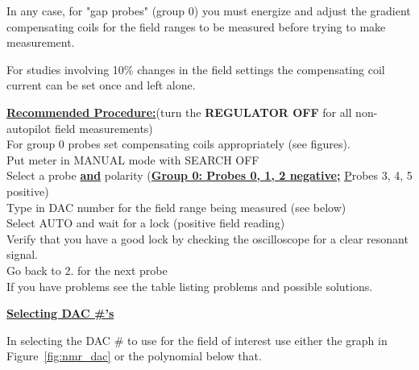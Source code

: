 {In any case, for "gap probes" (group 0) you must energize and adjust 
the gradient compensating coils for the field ranges to be measured before 
trying to make measurement.

For studies involving 
10\% changes in the field settings the compensating coil current can be 
set once and left alone.


\noindent\underline{\bf Recommended Procedure:}(turn the {\bf REGULATOR OFF} for all 
non-autopilot field measurements)\\
For group 0 probes set compensating coils appropriately (see figures).\\
Put meter in MANUAL mode with SEARCH OFF \\
Select a probe \underline{\bf and} polarity (\underline{\bf Group 0:  
Probes 0, 1, 2 negative;} {\underline Probes 3, 4, 5 positive}) \\
Type in DAC number for the field range being measured (see below) \\
Select AUTO and wait for a lock (positive field reading) \\
Verify that you have a good lock by checking the oscilloscope for a 
clear resonant signal. \\
Go back to 2. for the next probe \\
If you have problems see the table listing problems and possible 
solutions.

\noindent\underline{\bf Selecting DAC \#'s}

In selecting the DAC \# to use for the field of interest use 
either the graph in Figure~\ref{fig:nmr_dac} or the polynomial below that.

\pagebreak
{}\\

}
